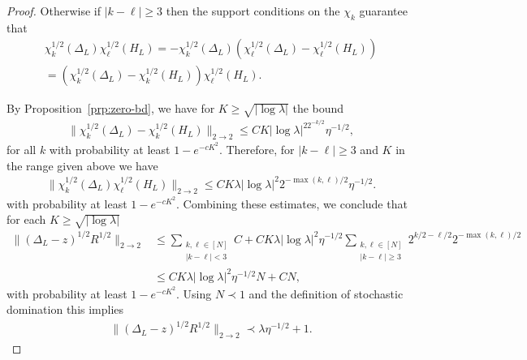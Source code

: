 \documentclass[11pt]{amsart}
\newcommand{\ldom}{\prec}
\numberwithin{equation}{section}
\numberwithin{theorem}{section}
\begin{document}
\begin{proof}
Otherwise if $|k-\ell|\geq 3$ then
the support conditions on the $\chi_k$ guarantee that
\begin{align*}
\chi_k^{1 / 2}	(\Delta_L)\chi_{\ell}^{1 /2}(H_L)=-\chi^{1/ 2}_{k}(\Delta_L)\left( \chi^{1 /2}_\ell(\Delta_L)-\chi^{1 /2}_{\ell}(H_L)\right) \\
=\left( \chi^{1 /2}_k(\Delta_L)-\chi^{1 /2}_{k}(H_L)\right) \chi^{1 /2}_{\ell}(H_L).
\end{align*}

By Proposition~\ref{prp:zero-bd}, we have for $K\geq \sqrt{|\log\lambda|}$ the bound
\begin{align*}
\|\chi^{1 /2}_k(\Delta_L)-\chi^{1 /2}_{k}(H_L)\|_{2\to 2}\leq CK|\log\lambda|^22^{-k /2}\eta^{-1 /2},
\end{align*}
for all $k$ with probability at least $1-e^{-cK^2}$. Therefore, for $|k-\ell|\geq 3$ and $K$ in the range given above we have
\begin{align*}
	\|\chi_k^{1 / 2}(\Delta_L)\chi_{\ell}^{1 /2}(H_L)\|_{2\to 2}\leq CK\lambda|\log\lambda|^2 2^{-\max(k,\ell) / 2}\eta^{-1 /2}.
\end{align*}
with probability at least $1-e^{-cK^2}$. Combining these estimates, we conclude that for each $K\geq \sqrt{|\log\lambda|}$
\begin{align*}
\|(\Delta_L-z)^{1 /2}R^{1/2}\|_{2\to 2}&\leq
\sum_{\substack{k,\ell\in[N] \\ |k-\ell|<3}} C +
CK\lambda|\log\lambda|^2 \eta^{-1 /2}\sum_{\substack{k,\ell\in[N]\\|k-\ell|\geq 3}}2^{k/ 2-\ell / 2}2^{-\max(k,\ell) / 2}\\
&\leq CK\lambda |\log \lambda|^2\eta^{-1/2}N + CN,
\end{align*}
with probability at least $1-e^{-cK^2}$.
Using $N\ldom 1$ and the definition of stochastic domination this implies
\begin{align*}
\|(\Delta_L-z)^{1 /2}R^{1/2}\|_{2\to 2}\prec \lambda \eta^{-1 /2} + 1.
\end{align*}
\end{proof}
\end{document}
